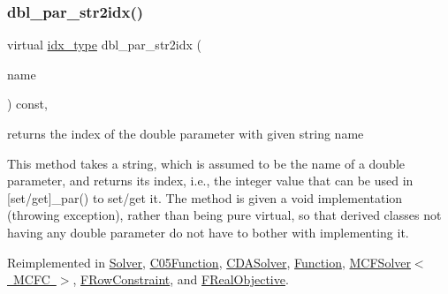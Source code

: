 \mbox{\label{class_s_m_spp__di__unipi__it_1_1_thin_compute_interface_a82f363814aa27e3243ba994a1ed5f39e}} 
\subsubsection{\texorpdfstring{dbl\+\_\+par\+\_\+str2idx()}{dbl\_par\_str2idx()}}
{\footnotesize\ttfamily virtual \mbox{\hyperlink{class_s_m_spp__di__unipi__it_1_1_thin_compute_interface_aa3d710629ad8c434286726ad810c3b47}{idx\+\_\+type}} dbl\+\_\+par\+\_\+str2idx (\begin{DoxyParamCaption}\item[{const std\+::string \&}]{name }\end{DoxyParamCaption}) const\hspace{0.3cm}{\ttfamily [inline]}, {\ttfamily [virtual]}}



returns the index of the double parameter with given string name 

This method takes a string, which is assumed to be the name of a double parameter, and returns its index, i.\+e., the integer value that can be used in \mbox{[}set/get\mbox{]}\+\_\+par() to set/get it. The method is given a void implementation (throwing exception), rather than being pure virtual, so that derived classes not having any double parameter do not have to bother with implementing it. 

Reimplemented in \mbox{\hyperlink{class_s_m_spp__di__unipi__it_1_1_solver_a6d353ac3d1200d9bea89235da61bc4f3}{Solver}}, \mbox{\hyperlink{class_s_m_spp__di__unipi__it_1_1_c05_function_a6d353ac3d1200d9bea89235da61bc4f3}{C05\+Function}}, \mbox{\hyperlink{class_s_m_spp__di__unipi__it_1_1_c_d_a_solver_a6d353ac3d1200d9bea89235da61bc4f3}{C\+D\+A\+Solver}}, \mbox{\hyperlink{class_s_m_spp__di__unipi__it_1_1_function_a6d353ac3d1200d9bea89235da61bc4f3}{Function}}, \mbox{\hyperlink{class_s_m_spp__di__unipi__it_1_1_m_c_f_solver_a6d353ac3d1200d9bea89235da61bc4f3}{M\+C\+F\+Solver$<$ M\+C\+F\+C $>$}}, \mbox{\hyperlink{class_s_m_spp__di__unipi__it_1_1_f_row_constraint_a6d353ac3d1200d9bea89235da61bc4f3}{F\+Row\+Constraint}}, and \mbox{\hyperlink{class_s_m_spp__di__unipi__it_1_1_f_real_objective_a6d353ac3d1200d9bea89235da61bc4f3}{F\+Real\+Objective}}.

